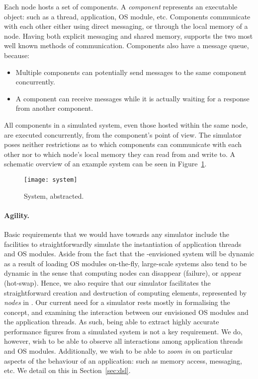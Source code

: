 Each node hosts a set of components.
A \emph{component} represents an executable object: such as a thread, application, OS module, etc.
Components communicate with each other either using direct messaging, or through the local memory of a node.
Having both explicit messaging and shared memory, 
\soosim supports the two most well known methods of communication.
Components also have a message queue, because:
\begin{itemize}
  \item Multiple components can potentially send messages to the same component concurrently.
  \item A component can receive messages while it is actually waiting for a response from another component.
\end{itemize}
All components in a simulated system, even those hosted within the same node, are executed concurrently, from the component's point of view.
The simulator poses neither restrictions as to which components can communicate with each other nor to which node's local memory they can read from and write to.
A schematic overview of an example system can be seen in Figure~\ref{fig:system}.

\begin{figure}
\centering
%
\texttt{[image: system]}
\caption{System, abstracted.}
\label{fig:system}
\end{figure}

\paragraph{Agility.}
Basic requirements that we would have towards any simulator include the facilities to straightforwardly simulate the instantiation of application threads and OS modules.
Aside from the fact that the \soos-envisioned system will be dynamic as a result of loading OS modules on-the-fly, large-scale systems also tend to be dynamic in the sense that computing nodes can disappear (failure), or
appear (hot-swap).
Hence, we also require that our simulator facilitates the straightforward creation and destruction of computing elements, represented by \emph{nodes} in \soosim.
Our current need for a simulator rests mostly in formalising the \soos concept, and examining the interaction between our envisioned OS modules and the application threads.
As such, being able to extract highly accurate performance figures from a simulated system is not a key requirement.
We do, however, wish to be able to observe all interactions among application threads and OS modules.
Additionally, we wish to be able to \emph{zoom in} on particular aspects of the behaviour of an application: such as memory access, messaging, etc.
We detail on this in Section~\ref{sec:dsl}.

